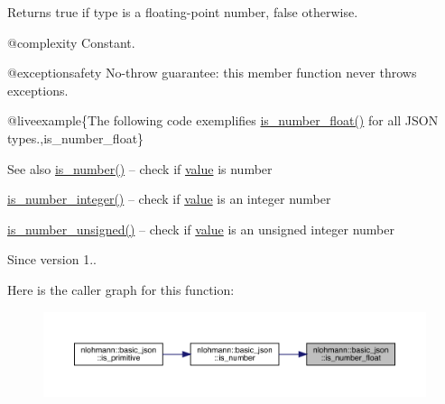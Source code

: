 \begin{DoxyReturn}{Returns}
{\ttfamily true} if type is a floating-\/point number, {\ttfamily false} otherwise.
\end{DoxyReturn}
@complexity Constant.

@exceptionsafety No-\/throw guarantee\+: this member function never throws exceptions.

@liveexample\{The following code exemplifies {\ttfamily \mbox{\hyperlink{classnlohmann_1_1basic__json_a33b4bf898b857c962e798fc7f6e86e70}{is\+\_\+number\+\_\+float()}}} for all J\+S\+ON types.,is\+\_\+number\+\_\+float\}

\begin{DoxySeeAlso}{See also}
\mbox{\hyperlink{classnlohmann_1_1basic__json_a2b9852390abb4b1ef5fac6984e2fc0f3}{is\+\_\+number()}} -- check if \mbox{\hyperlink{classnlohmann_1_1basic__json_af9c51328fbe1da75eca750be3009917a}{value}} is number 

\mbox{\hyperlink{classnlohmann_1_1basic__json_abac8af76067f1e8fdca9052882c74428}{is\+\_\+number\+\_\+integer()}} -- check if \mbox{\hyperlink{classnlohmann_1_1basic__json_af9c51328fbe1da75eca750be3009917a}{value}} is an integer number 

\mbox{\hyperlink{classnlohmann_1_1basic__json_abc7378cba0613a78b9aad1c8e7044bb0}{is\+\_\+number\+\_\+unsigned()}} -- check if \mbox{\hyperlink{classnlohmann_1_1basic__json_af9c51328fbe1da75eca750be3009917a}{value}} is an unsigned integer number
\end{DoxySeeAlso}
\begin{DoxySince}{Since}
version 1.. 
\end{DoxySince}
Here is the caller graph for this function\+:
\nopagebreak
\begin{figure}[H]
\begin{center}
\leavevmode
\includegraphics[width=350pt]{classnlohmann_1_1basic__json_a33b4bf898b857c962e798fc7f6e86e70_icgraph}
\end{center}
\end{figure}
\mbox{\label{classnlohmann_1_1basic__json_abac8af76067f1e8fdca9052882c74428}} 
